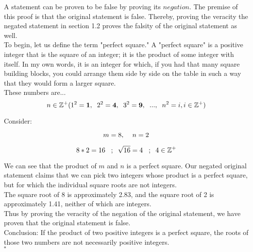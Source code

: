 \documentclass[12pt]{article}
\begin{document}
A statement can be proven to be false by proving its $\textit{negation}$. The premise of this proof is that the original statement is false. Thereby, proving the veracity the negated statement in section 1.2 proves the falsity of the original statement as well. \\

To begin, let us define the term "perfect square." A "perfect square" is a positive integer that is the square of an integer; it is the product of some integer with itself. In my own words, it is an integer for which, if you had that many square building blocks, you could arrange them side by side on the table in such a way that they would form a larger square. \\

These numbers are... \\

\begin{equation}
{n\in \mathbb{Z}^+ (1^2 = \textbf{1}, \hspace{0.2cm}2^2 = 
\textbf{4}, \hspace{0.2cm}3^2 = \textbf{9},\hspace{0.2cm} ..., \hspace{0.2cm} n^2 = i, i \in \mathbb{Z}^+)}
\end{equation}

Consider: 

\begin{equation}
m = 8, \hspace{0.4cm} n = 2 
\end{equation}

\begin{equation}
8 * 2 = 16 \; \hspace{0.2cm}; \hspace{0.2cm}\sqrt{16} = 4 \; \hspace{0.2cm}; \hspace{0.2cm}4 \in \mathbb{Z}^+
\end{equation}
\bigskip

We can see that the product of $m$ and $n$ is a perfect square. Our negated original statement claims that we can pick two integers whose product is a perfect square, but for which the individual square roots are not integers. \\

The square root of 8 is approximately 2.83, and the square root of 2 is approximately 1.41, neither of which are integers. \\

Thus by proving the veracity of the negation of the original statement, we have proven that the original statement is false. \\

Conclusion: If the product of two positive integers is a perfect square, the roots of those two numbers are not necessarily positive integers. \\

$\square$
\end{document}
